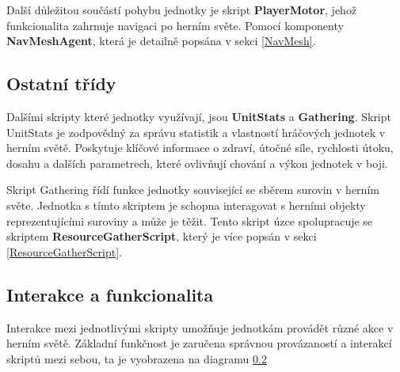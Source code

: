 Další důležitou součástí pohybu jednotky je skript \textbf{PlayerMotor}, jehož funkcionalita zahrnuje navigaci po herním světe. Pomocí komponenty \textbf{NavMeshAgent}, která je detailně popsána v sekci \ref{NavMesh}.

\subsection{Ostatní třídy}
Dalšími skripty které jednotky využívají, jsou \textbf{UnitStats} a \textbf{Gathering}. Skript UnitStats je zodpovědný za správu statistik a vlastností hráčových jednotek v herním světě. Poskytuje klíčové informace o zdraví, útočné síle, rychlosti útoku, dosahu a dalších parametrech, které ovlivňují chování a výkon jednotek v boji. 

Skript Gathering řídí funkce jednotky související se sběrem surovin v herním světe. Jednotka s tímto skriptem je schopna interagovat s herními objekty reprezentujícími suroviny a může je těžit. Tento skript úzce spolupracuje se skriptem \textbf{ResourceGatherScript}, který je více popsán v sekci \ref{ResourceGatherScript}.

\subsection{Interakce a funkcionalita}
Interakce mezi jednotlivými skripty umožňuje jednotkám provádět různé akce v herním světě. Základní funkčnost je zaručena správnou provázaností a interakcí skriptů mezi sebou, ta je vyobrazena na diagramu \ref{}

